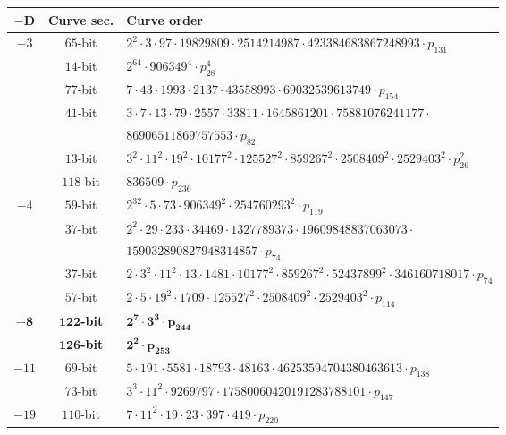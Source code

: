 \documentclass{article}
\theoremstyle{definition}
\begin{document}
\begin{table}[!ht]
    \centering\footnotesize
    \begin{tabularx}{\textwidth}{ccl}
        \toprule                            
        $\mathbf{-D}$    & \textbf{Curve sec.}  & \textbf{Curve order} \\
        \midrule        
$-3$ & $65$-bit & $2^{2}  \cdot 3  \cdot 97  \cdot 19829809  \cdot 2514214987  \cdot 423384683867248993  \cdot p_{131}$\\
 & $14$-bit & $2^{64}  \cdot 906349^{4}  \cdot p_{28}^{4}$\\
 & $77$-bit & $7  \cdot 43  \cdot 1993  \cdot 2137  \cdot 43558993  \cdot 69032539613749  \cdot p_{154}$\\
 & $41$-bit & $3  \cdot 7  \cdot 13  \cdot 79  \cdot 2557  \cdot 33811
        \cdot 1645861201  \cdot 75881076241177 \cdot$\\
 &          & $86906511869757553  \cdot p_{82}$\\
 & $13$-bit & $3^{2}  \cdot 11^{2}  \cdot 19^{2}  \cdot 10177^{2}  \cdot 125527^{2}  \cdot 859267^{2}  \cdot 2508409^{2}  \cdot 2529403^{2}  \cdot p_{26}^{2}$\\
 & $118$-bit & $836509  \cdot p_{236}$\\
$-4$ & $59$-bit & $2^{32}  \cdot 5  \cdot 73  \cdot 906349^{2}  \cdot 254760293^{2}  \cdot p_{119}$\\
 & $37$-bit & $2^{2}  \cdot 29  \cdot 233  \cdot 34469  \cdot
        1327789373  \cdot 19609848837063073 \cdot$\\
 &          & $159032890827948314857  \cdot p_{74}$\\
 & $37$-bit & $2  \cdot 3^{2}  \cdot 11^{2}  \cdot 13  \cdot 1481  \cdot 10177^{2}  \cdot 859267^{2}  \cdot 52437899^{2}  \cdot 346160718017  \cdot p_{74}$\\
 & $57$-bit & $2  \cdot 5  \cdot 19^{2}  \cdot 1709  \cdot 125527^{2}  \cdot 2508409^{2}  \cdot 2529403^{2}  \cdot p_{114}$\\
$\mathbf{-8}$ & $\mathbf{122}$\textbf{-bit} & $\mathbf{2^{7}  \cdot 3^{3}  \cdot p_{244}}$\\
 & $\mathbf{126}$\textbf{-bit} & $\mathbf{2^{2}  \cdot p_{253}}$\\
$-11$ & $69$-bit & $5  \cdot 191  \cdot 5581  \cdot 18793  \cdot 48163  \cdot 46253594704380463613  \cdot p_{138}$\\
 & $73$-bit & $3^{3}  \cdot 11^{2}  \cdot 9269797  \cdot 17580060420191283788101  \cdot p_{147}$\\
$-19$ & $110$-bit & $7  \cdot 11^{2}  \cdot 19  \cdot 23  \cdot 397  \cdot 419  \cdot p_{220}$\\

\end{tabularx}
\end{table}
\end{document}
